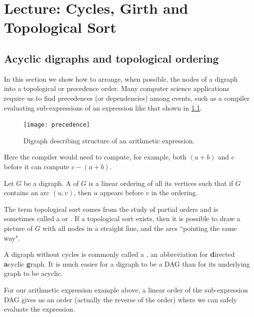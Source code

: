 \chapter{Lecture: Cycles, Girth and Topological Sort}


\section{Acyclic digraphs and topological ordering}
\label{sec:dag}

In this section we show how to arrange, when possible, the nodes
of a digraph into a topological or precedence order.  Many computer
science applications require us to find precedences (or dependencies)
among events, such as a compiler evaluating sub-expressions of an
expression like that shown in \cref{fig:prec}.

\begin{figure}[hbtp] %
	\centering
	\texttt{[image: precedence]}
	\caption{Digraph describing structure of an arithmetic expression.}
	\label{fig:prec}
\end{figure} 

Here the compiler would need to compute, for example, both $(a+b)$ and
$c$ before it can compute $c-(a+b)$.

\begin{Definition}
Let $G$ be a digraph. A  of $G$ is a linear
ordering of all its vertices such that if $G$ contains an arc $(u,v)$,
then $u$ appears before $v$ in the ordering.
\end{Definition}

The term topological sort comes from the study of partial orders and is
sometimes called a  or .
 If a topological sort exists, then it is possible to draw a picture  of
$G$ with all nodes in a straight line, and the arcs ``pointing the same
way".

A digraph without cycles is commonly called a , an
abbreviation for \textbf{d}irected \textbf{a}cyclic
\textbf{g}raph. It is much easier for a digraph to be a
DAG than for its underlying graph to be acyclic. %

For our arithmetic expression example above, a linear
order of the sub-expression DAG gives us an order (actually the reverse
of the order) where we can safely evaluate the expression.

